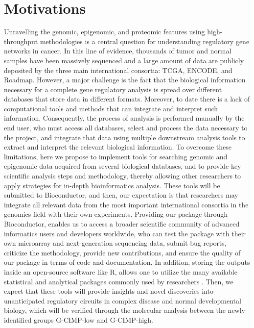 \section{Motivations}


Unravelling the genomic, epigenomic, and proteomic features using high-throughput methodologies is a central question for understanding regulatory gene networks in cancer. In this line of evidence, thousands of tumor and normal samples have been massively sequenced and a large amount of data are publicly deposited by the three main international consortia: TCGA, ENCODE, and Roadmap. However, a major challenge is the fact that the biological information necessary for a complete gene regulatory analysis is spread over different databases that store data in different formats. Moreover, to date there is a lack of  computational tools and methods that can integrate and interpret such information. Consequently, the process of analysis is performed manually by the end user, who must access all databases, select and process the data necessary to the project, and integrate that data using multiple downstream analysis tools to extract and interpret the relevant biological information.
To overcome these limitations, here we propose to implement tools for searching genomic and epigenomic data acquired from several biological databases, and to provide key scientific analysis steps and methodology, thereby allowing other researchers to apply  strategies for in-depth bioinformatics analysis. These tools will be submitted to Bioconductor, and then, our expectation is that researchers may integrate all relevant data from the most important international consortia in the genomics field with their own experiments. Providing our package through Bioconductor, enables us to access a broader scientific community of advanced informatics users and developers worldwide, who can test the package with their own microarray and next-generation sequencing data, submit bug reports, criticize the methodology, provide new contributions, and ensure the quality of our package in terms of code and documentation.  In addition, storing the outputs inside an open-source software like R, allows one to utilize the many available statistical and analytical packages commonly used by researchers \cite{creditcode}. Then, we expect that these tools will provide insights and novel discoveries into unanticipated regulatory circuits in complex disease and normal developmental biology, which will be verified through the molecular analysis between the newly identified groups G-CIMP-low and G-CIMP-high.


